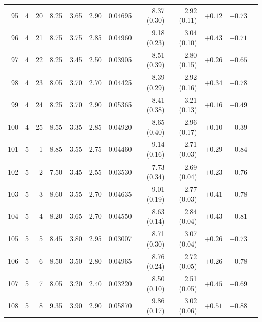 \begin{longtable}{@{}rrrrrrrrrrrr@{}}
95 & 4 & 20 & \num{8.25} & \num{3.65} & \num{2.90} & \num{0.04695} & \num{8.37} (\num{0.30}) & \num{2.92} (\num{0.11}) & $+\num{0.12}$ & $-\num{0.73}$ &  \\
96 & 4 & 21 & \num{8.75} & \num{3.75} & \num{2.85} & \num{0.04960} & \num{9.18} (\num{0.23}) & \num{3.04} (\num{0.10}) & $+\num{0.43}$ & $-\num{0.71}$ &  \\
97 & 4 & 22 & \num{8.25} & \num{3.45} & \num{2.50} & \num{0.03905} & \num{8.51} (\num{0.39}) & \num{2.80} (\num{0.15}) & $+\num{0.26}$ & $-\num{0.65}$ &  \\
98 & 4 & 23 & \num{8.05} & \num{3.70} & \num{2.70} & \num{0.04425} & \num{8.39} (\num{0.29}) & \num{2.92} (\num{0.16}) & $+\num{0.34}$ & $-\num{0.78}$ &  \\
99 & 4 & 24 & \num{8.25} & \num{3.70} & \num{2.90} & \num{0.05365} & \num{8.41} (\num{0.38}) & \num{3.21} (\num{0.13}) & $+\num{0.16}$ & $-\num{0.49}$ &  \\
100 & 4 & 25 & \num{8.55} & \num{3.35} & \num{2.85} & \num{0.04920} & \num{8.65} (\num{0.40}) & \num{2.96} (\num{0.17}) & $+\num{0.10}$ & $-\num{0.39}$ &  \\
101 & 5 & 1 & \num{8.85} & \num{3.55} & \num{2.75} & \num{0.04460} & \num{9.14} (\num{0.16}) & \num{2.71} (\num{0.03}) & $+\num{0.29}$ & $-\num{0.84}$ &  \\
102 & 5 & 2 & \num{7.50} & \num{3.45} & \num{2.55} & \num{0.03530} & \num{7.73} (\num{0.34}) & \num{2.69} (\num{0.04}) & $+\num{0.23}$ & $-\num{0.76}$ &  \\
103 & 5 & 3 & \num{8.60} & \num{3.55} & \num{2.70} & \num{0.04635} & \num{9.01} (\num{0.19}) & \num{2.77} (\num{0.03}) & $+\num{0.41}$ & $-\num{0.78}$ &  \\
104 & 5 & 4 & \num{8.20} & \num{3.65} & \num{2.70} & \num{0.04550} & \num{8.63} (\num{0.14}) & \num{2.84} (\num{0.04}) & $+\num{0.43}$ & $-\num{0.81}$ &  \\
105 & 5 & 5 & \num{8.45} & \num{3.80} & \num{2.95} & \num{0.03007} & \num{8.71} (\num{0.30}) & \num{3.07} (\num{0.04}) & $+\num{0.26}$ & $-\num{0.73}$ &  \\
106 & 5 & 6 & \num{8.50} & \num{3.50} & \num{2.80} & \num{0.04965} & \num{8.76} (\num{0.24}) & \num{2.72} (\num{0.05}) & $+\num{0.26}$ & $-\num{0.78}$ &  \\
107 & 5 & 7 & \num{8.05} & \num{3.20} & \num{2.40} & \num{0.03220} & \num{8.50} (\num{0.10}) & \num{2.51} (\num{0.05}) & $+\num{0.45}$ & $-\num{0.69}$ &  \\
108 & 5 & 8 & \num{9.35} & \num{3.90} & \num{2.90} & \num{0.05870} & \num{9.86} (\num{0.17}) & \num{3.02} (\num{0.06}) & $+\num{0.51}$ & $-\num{0.88}$ &  \\

\end{longtable}
